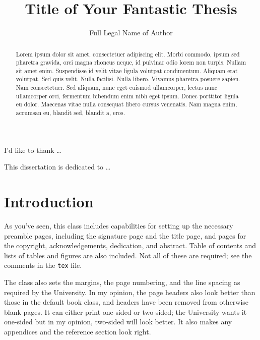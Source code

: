 \documentclass[oneside]{umnStatThesis}
\author{Full Legal Name of Author}
\title{Title of Your Fantastic Thesis}
\begin{document}
\makesignaturepage %
\maketitlepage %
\makecopyrightpage %

\frontmatter

\begin{acknowledgementspage} %
I'd like to thank \dots
\end{acknowledgementspage}

\begin{dedicationpage} %
This dissertation is dedicated to \dots
\end{dedicationpage}
\begin{abstract} %
Lorem ipsum dolor sit amet, consectetuer adipiscing elit. Morbi commodo, ipsum sed pharetra gravida, orci magna rhoncus neque, id pulvinar odio lorem non turpis. Nullam sit amet enim. Suspendisse id velit vitae ligula volutpat condimentum. Aliquam erat volutpat. Sed quis velit. Nulla facilisi. Nulla libero. Vivamus pharetra posuere sapien. Nam consectetuer. Sed aliquam, nunc eget euismod ullamcorper, lectus nunc ullamcorper orci, fermentum bibendum enim nibh eget ipsum. Donec porttitor ligula eu dolor. Maecenas vitae nulla consequat libero cursus venenatis. Nam magna enim, accumsan eu, blandit sed, blandit a, eros.
\end{abstract}

\tableofcontents %
\cleardoublepage
{}
\listoftables
\cleardoublepage
{} 
\listoffigures

\mainmatter

\chapter{Introduction}
As you've seen, this class includes capabilities for setting up the necessary preamble pages, including the signature page and the title page, and pages for the copyright, acknowledgements, dedication, and abstract.  Table of contents and lists of tables and figures are also included.  Not all of these are required; see the comments in the \verb+tex+ file.

The class also sets the margins, the page numbering, and the line spacing as required by the University.  In my opinion, the page headers also look better than those in the default book class, and headers have been removed from otherwise blank pages.
It can either print one-sided or two-sided; the University wants it one-sided but in my opinion, two-sided will look better.  It also makes any appendices and the reference section look right.
\end{document}
